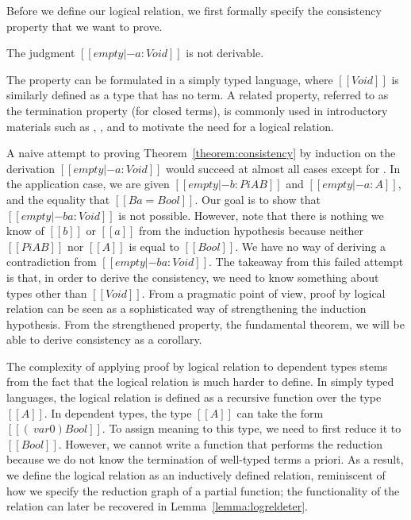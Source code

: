 \documentclass[acmsmall,screen=true,
\ifpublic review=false\else,review=true\fi
  ,anonymous=\ifanonymous true\else false\fi]{acmart}
\begin{document}
Before we define our logical relation, we first formally specify the
consistency property that we want to prove.
\begin{theorem}
  \label{theorem:consistency}
  The judgment $[[empty |- a : Void ]]$ is not derivable.
\end{theorem}
The property can be formulated in a simply typed language, where
$[[Void]]$ is similarly defined as a type that has no term. A related
property, referred to as the termination property (for closed terms),
is commonly used in introductory materials such as
\citet{skorstengaard2019introduction}, \citet{pierce2002types}, and
\citet{harpertait} to motivate the need for a logical relation.

A naive attempt to proving Theorem~\ref{theorem:consistency} by
induction on the derivation $[[empty |- a : Void]]$ would succeed at
almost all cases except for . In the application
case, we are given $[[empty |- b : Pi A B]]$ and $[[empty |- a : A]]$, and
the equality that $[[B {a} = Bool]]$. Our goal is to show that
$[[empty |- b a : Void]]$ is not possible. However, note that there is
nothing we know of $[[b]]$ or $[[a]]$ from the induction hypothesis
because neither $[[Pi A B]]$ nor $[[A]]$ is equal to $[[Bool]]$.
We have no way of deriving a contradiction from $[[empty |- b a :
Void]]$. The takeaway from this failed attempt is that, in order to
derive the consistency, we need to know something about types other
than $[[Void]]$. From a pragmatic point of view, proof by logical
relation can be seen as a sophisticated way of strengthening the
induction hypothesis. From the strengthened property, the fundamental
theorem, we will be able to derive consistency as a corollary.

The complexity of applying proof by logical relation to dependent types stems
from the fact that the logical relation is much harder to define. In
simply typed languages, the logical relation is defined as a recursive
function over the type $[[A]]$.
In dependent types, the type
$[[A]]$ can take the form $[[(\ var 0) Bool]]$. To assign meaning to
this type, we need to first reduce it to $[[Bool]]$. However, we
cannot write a function that performs the reduction because we do not
know the termination of well-typed terms a priori. As a result, we
define the logical relation as an inductively defined relation,
reminiscent of how we specify the reduction graph of a partial
function; the functionality of the relation can later be recovered in Lemma~\ref{lemma:logreldeter}.
\end{document}
